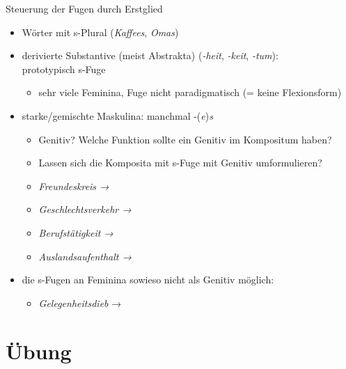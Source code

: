 \begin{frame}
  {Steuerung der Fugen durch Erstglied}
  \onslide<+->
  \begin{itemize}[<+->]
    \item Wörter mit s-Plural (\textit{Kaffees}, \textit{Omas}) 
      \Halbzeile
    \item \alert{derivierte} Substantive (meist Abstrakta) (\textit{-heit}, \textit{-keit}, \textit{-tum}):\\
      \alert{prototypisch s-Fuge}
      \begin{itemize}[<+->]
        \item sehr viele Feminina, Fuge nicht paradigmatisch (= keine Flexionsform)
      \end{itemize}
      \Halbzeile
    \item starke\slash gemischte Maskulina: manchmal -(\textit{e})\textit{s}
      \begin{itemize}[<+->]
        \item Genitiv? Welche Funktion sollte ein Genitiv im Kompositum haben?
        \item Lassen sich die Komposita mit s-Fuge mit Genitiv umformulieren?
        \item \textit{Freundeskreis → }
        \item \textit{Geschlechtsverkehr → }
        \item \textit{Berufstätigkeit → }
        \item \textit{Auslandsaufenthalt → }
      \end{itemize}
    \Halbzeile
  \item die s-Fugen an \alert{Feminina} sowieso nicht als Genitiv möglich:
      \begin{itemize}
        \item \textit{Gelegenheitsdieb} → 
      \end{itemize}
  \end{itemize}
\end{frame}

\section{Übung}

